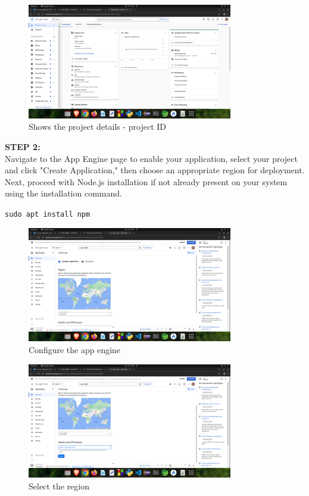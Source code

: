 \documentclass[12pt]{article}
\begin{document}
\begin{spacing}{1.5}
\begin{adjustwidth}{0cm}{0cm}
\begin{justify}
\begin{figure}[H]
    \centering
    \includegraphics[width=0.8\textwidth]{exp 5/s5.png}
    \caption{Shows the project details - project ID}
    \label{fig: 1}
\end{figure}

\textbf{STEP 2:} \\
Navigate to the App Engine page to enable your application, select your project and click "Create Application," then choose an appropriate region for deployment. Next, proceed with Node.js installation if not already present on your system using the installation command.

\begin{center}
\texttt{sudo apt install npm}
\end{center}

\begin{figure}[H]
    \centering
    \includegraphics[width=0.8\textwidth]{exp 5/s10.png}
    \caption{Configure the app engine}
    \label{fig: 1}
\end{figure}

\begin{figure}[H]
    \centering
    \includegraphics[width=0.8\textwidth]{exp 5/s11.png}
    \caption{Select the region}
    \label{fig: 1}
\end{figure}


\end{justify}
\end{adjustwidth}
\end{spacing}
\end{document}
